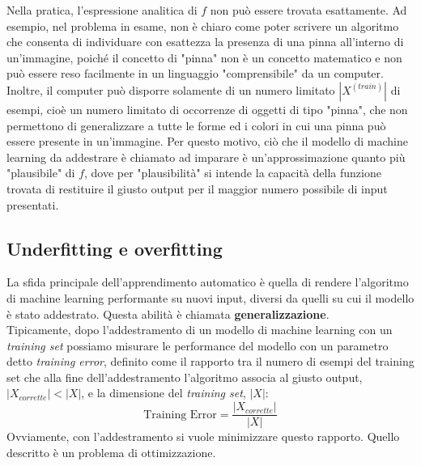 Nella pratica, l'espressione analitica di $f$ non può essere trovata esattamente. Ad esempio, nel problema in esame, non è chiaro come poter scrivere un algoritmo che consenta di individuare con esattezza la presenza di una pinna all'interno di un'immagine, poiché il concetto di "pinna" non è un concetto matematico e non può essere reso facilmente in un linguaggio "comprensibile" da un computer. Inoltre, il computer può disporre solamente di un numero limitato $\left|X^{(train)}\right|$ di esempi, cioè un numero limitato di occorrenze di oggetti di tipo "pinna", che non permettono di generalizzare a tutte le forme ed i colori in cui una pinna può essere presente in un'immagine. Per questo motivo, ciò che il modello di machine learning da addestrare è chiamato ad imparare è un'approssimazione quanto più "plausibile" di $f$, dove per "plausibilità" si intende la capacità della funzione trovata di restituire il giusto output per il maggior numero possibile di input presentati.

\subsection{Underfitting e overfitting}
\label{overfitting}
La sfida principale dell'apprendimento automatico è quella di rendere l'algoritmo di machine learning performante su nuovi input, diversi da quelli su cui il modello è stato addestrato. Questa abilità è chiamata \textbf{generalizzazione}.\\

Tipicamente, dopo l'addestramento di un modello di machine learning con un \textit{training set} possiamo misurare le performance del modello con un parametro detto \textit{training error}, definito come il rapporto tra il numero di esempi del training set che alla fine dell'addestramento l'algoritmo associa al giusto output, $\left|X_{corrette}\right|<\left|X\right|$, e la dimensione del \textit{training set}, $\left|X\right|$:
\[\text{Training Error}=\frac{\left|X_{corrette}\right|}{\left|X\right|}\]
Ovviamente, con l'addestramento si vuole minimizzare questo rapporto. Quello descritto è un problema di ottimizzazione.\\

